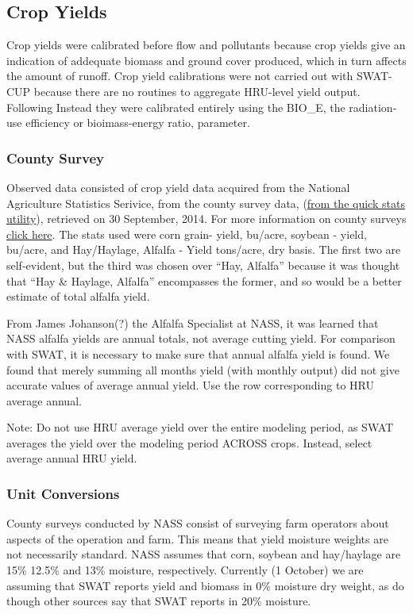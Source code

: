 \subsection{Crop Yields}


Crop yields were calibrated before flow and pollutants because crop yields give an indication of addequate biomass and ground cover produced, which in turn affects the amount of runoff. Crop yield calibrations were not carried out with SWAT-CUP because there are no routines to aggregate HRU-level yield output. Following  Instead they were calibrated entirely using the BIO\_E, the radiation-use efficiency or bioimass-energy ratio, parameter. 

	\subsubsection{County Survey}
Observed data consisted of crop yield data acquired from the National
Agriculture Statistics Serivice, from the county survey data,
(\href{http://quickstats.nass.usda.gov/results/CD8890FD-566F-3F66-8C8A-CB932E358991}{from
the quick stats utility}), retrieved on 30 September, 2014. For more information
on county surveys
\href{http://www.nass.usda.gov/Surveys/Guide_to_NASS_Surveys/County_Agricultural_Production/index.asp}{click
here}. The stats used were corn grain- yield, bu/acre, soybean - yield, bu/acre,
and Hay/Haylage, Alfalfa - Yield tons/acre, dry basis. The first two are
self-evident, but the third was chosen over ``Hay, Alfalfa'' because it was
thought that ``Hay \& Haylage, Alfalfa'' encompasses the former, and so would be
a better estimate of total alfalfa yield.
	
From James Johanson(?) the Alfalfa Specialist at NASS, it was learned that NASS
alfalfa yields  are annual totals, not average cutting yield. For comparison
with SWAT, it is necessary to make sure that annual alfalfa yield is found. We
found that merely summing all months yield (with monthly output) did not give
accurate values of average annual yield. Use the row corresponding to HRU
average annual.
	
Note: Do not use HRU average yield over the entire modeling period, as SWAT
averages the yield over the modeling period ACROSS crops. Instead, select
average annual HRU yield.

	\subsubsection{Unit Conversions}
County surveys conducted by NASS consist of surveying farm operators about
aspects of the operation and farm. This means that yield moisture weights are
not necessarily standard. NASS assumes that corn, soybean and hay/haylage are
15\% 12.5\% and 13\% moisture, respectively.
Currently (1 October) we are assuming that SWAT reports yield and biomass in 0\%
moisture dry weight, as do \citet{almendinger_contructingsunrise_2010} though
other sources \citep{srinivasan_swatungauged_2010} say that SWAT reports in 20\%
moisture.

